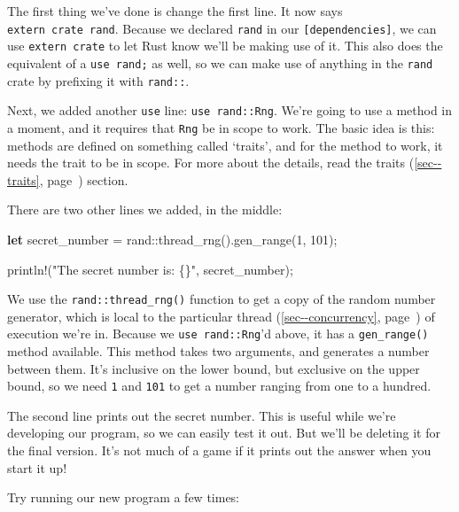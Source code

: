 \documentclass[a4paper,]{book}
\renewcommand*{\hyperref}[2][\ar]{%
  \def\ar{#2}%
  #2 (\autoref{#1}, page~\pageref{#1})}
\newenvironment{Shaded}{\begin{snugshade}}{\end{snugshade}}
\newcommand{\KeywordTok}[1]{\textcolor[rgb]{0.13,0.29,0.53}{\textbf{{#1}}}}
\newcommand{\DecValTok}[1]{\textcolor[rgb]{0.00,0.00,0.81}{{#1}}}
\newcommand{\StringTok}[1]{\textcolor[rgb]{0.31,0.60,0.02}{{#1}}}
\newcommand{\OtherTok}[1]{\textcolor[rgb]{0.56,0.35,0.01}{{#1}}}
\newcommand{\NormalTok}[1]{{#1}}
\begin{document}
The first thing we've done is change the first line. It now says
\texttt{extern\ crate\ rand}. Because we declared \texttt{rand} in our
\texttt{{[}dependencies{]}}, we can use \texttt{extern\ crate} to let
Rust know we'll be making use of it. This also does the equivalent of a
\texttt{use\ rand;} as well, so we can make use of anything in the
\texttt{rand} crate by prefixing it with \texttt{rand::}.

Next, we added another \texttt{use} line: \texttt{use\ rand::Rng}. We're
going to use a method in a moment, and it requires that \texttt{Rng} be
in scope to work. The basic idea is this: methods are defined on
something called `traits', and for the method to work, it needs the
trait to be in scope. For more about the details, read the
\hyperref[sec--traits]{traits} section.

There are two other lines we added, in the middle:

\begin{Shaded}
\begin{Highlighting}[]
    \KeywordTok{let} \NormalTok{secret_number = rand::thread_rng().gen_range(}\DecValTok{1}\NormalTok{, }\DecValTok{101}\NormalTok{);}

    \OtherTok{println!}\NormalTok{(}\StringTok{"The secret number is: \{\}"}\NormalTok{, secret_number);}
\end{Highlighting}
\end{Shaded}

We use the \texttt{rand::thread\_rng()} function to get a copy of the
random number generator, which is local to the particular
\hyperref[sec--concurrency]{thread} of execution we're in. Because we
\texttt{use\ rand::Rng}'d above, it has a \texttt{gen\_range()} method
available. This method takes two arguments, and generates a number
between them. It's inclusive on the lower bound, but exclusive on the
upper bound, so we need \texttt{1} and \texttt{101} to get a number
ranging from one to a hundred.

The second line prints out the secret number. This is useful while we're
developing our program, so we can easily test it out. But we'll be
deleting it for the final version. It's not much of a game if it prints
out the answer when you start it up!

Try running our new program a few times:
\end{document}
